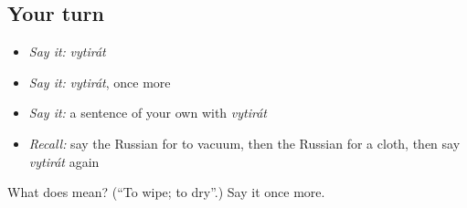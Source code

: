 \subsection*{Your turn}
\begin{itemize}
\raggedright
  \item \emph{Say it:} \emph{vytirát}
  \item \emph{Say it:} \emph{vytirát}, once more
  \item \emph{Say it:} a sentence of your own with \emph{vytirát}
  \item \emph{Recall:} say the Russian for to vacuum, then the Russian for a cloth, then say \emph{vytirát} again
\end{itemize}

\begin{tcolorbox}[breakable,colback=teal!4,colframe=teal!35!black,title={Before you move on}]
What does  mean? (\textquotedblleft{}To wipe; to dry\textquotedblright{}.) Say it once more.
\end{tcolorbox}
